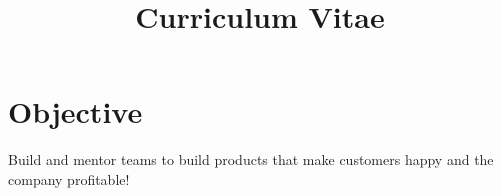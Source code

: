 \documentclass[11pt,a4paper,sans]{moderncv} %
\title{Curriculum Vitae}
\begin{document}
\makecvtitle %


\section{Objective}
Build and mentor teams to build products that make customers happy and the company profitable!


\end{document}
